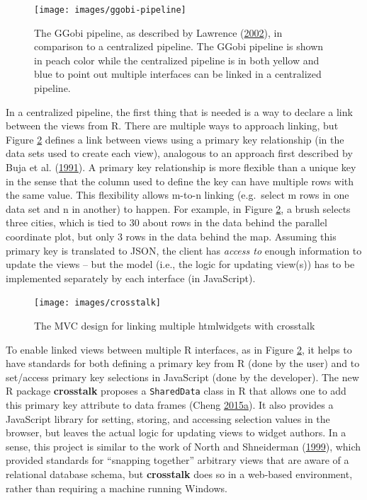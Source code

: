 \documentclass[12pt,]{isuthesis}
\begin{document}
\begin{figure}
\centering
\texttt{[image: images/ggobi-pipeline]}
\caption{\label{fig:central-pipeline}The GGobi pipeline, as described by
Lawrence (\protect\hyperlink{ref-ggobi-pipeline-design}{2002}), in
comparison to a centralized pipeline. The GGobi pipeline is shown in
peach color while the centralized pipeline is in both yellow and blue to
point out multiple interfaces can be linked in a centralized pipeline.}
\end{figure}

In a centralized pipeline, the first thing that is needed is a way to
declare a link between the views from R. There are multiple ways to
approach linking, but Figure \ref{fig:crosstalk} defines a link between
views using a primary key relationship (in the data sets used to create
each view), analogous to an approach first described by Buja et al.
(\protect\hyperlink{ref-Buja:1991vh}{1991}). A primary key relationship
is more flexible than a unique key in the sense that the column used to
define the key can have multiple rows with the same value. This
flexibility allows m-to-n linking (e.g.~select m rows in one data set
and n in another) to happen. For example, in Figure \ref{fig:crosstalk},
a brush selects three cities, which is tied to 30 about rows in the data
behind the parallel coordinate plot, but only 3 rows in the data behind
the map. Assuming this primary key is translated to JSON, the client has
\emph{access to} enough information to update the views -- but the model
(i.e., the logic for updating view(s)) has to be implemented separately
by each interface (in JavaScript).

\begin{figure}
\centering
\texttt{[image: images/crosstalk]}
\caption{\label{fig:crosstalk}The MVC design for linking multiple
htmlwidgets with crosstalk}
\end{figure}

To enable linked views between multiple R interfaces, as in Figure
\ref{fig:crosstalk}, it helps to have standards for both defining a
primary key from R (done by the user) and to set/access primary key
selections in JavaScript (done by the developer). The new R package
\textbf{crosstalk} proposes a \texttt{SharedData} class in R that allows
one to add this primary key attribute to data frames (Cheng
\protect\hyperlink{ref-crosstalk}{2015}\protect\hyperlink{ref-crosstalk}{a}).
It also provides a JavaScript library for setting, storing, and
accessing selection values in the browser, but leaves the actual logic
for updating views to widget authors. In a sense, this project is
similar to the work of North and Shneiderman
(\protect\hyperlink{ref-North:1999vi}{1999}), which provided standards
for ``snapping together'' arbitrary views that are aware of a relational
database schema, but \textbf{crosstalk} does so in a web-based
environment, rather than requiring a machine running Windows.
\end{document}
